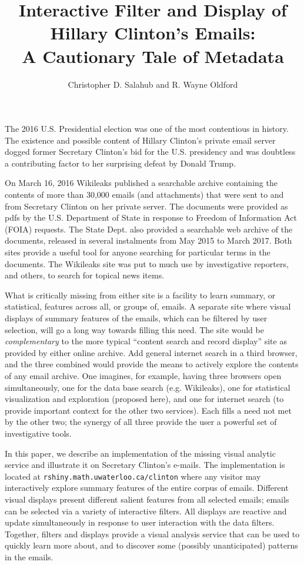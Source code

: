 \documentclass[journal]{vgtc}                %
\title{Interactive Filter and Display of Hillary Clinton's Emails: \\A Cautionary Tale of Metadata}
\author{Christopher D. Salahub and R. Wayne Oldford}
\begin{document}
\maketitle
The 2016 U.S. Presidential election was one of the most contentious in history.  The existence and possible content of Hillary Clinton's private email server dogged former Secretary Clinton's bid for the U.S. presidency and was doubtless a contributing factor to her surprising defeat by Donald Trump.

On March 16, 2016 Wikileaks  published a searchable archive \cite{Wikileaks} containing the contents of more than 30,000 emails (and attachments) that were sent to and from Secretary Clinton on her private server.  The documents were provided as pdfs by the U.S. Department of State in response to Freedom of Information Act (FOIA) \cite{FOIA} requests.  The State Dept. also provided a searchable web archive of the documents, released in several instalments from May 2015 to March 2017\cite{StateDeptFOIA}.   Both sites provide a  useful tool for anyone searching for particular terms in the documents.  The Wikileaks site was put to much use by investigative reporters, and others, to search for topical news items.

What is critically missing from either site is a facility to learn summary, or statistical, features across all, or groups of,  emails.   A separate site where visual displays of summary features of the emails, which can be filtered by user selection, will go a long way towards filling this need.  The site would be \emph{complementary} to the more typical ``content search and record display'' site as provided by either online archive.   Add general internet search in a third browser, and the three combined would provide the means to actively explore the contents of any email archive.    One imagines, for example, having three browsers open simultaneously, one for the data base search (e.g. Wikileaks), one for statistical visualization and exploration (proposed here), and one for internet search (to provide important context for the other two services).  Each fills a need not met by the other two; the synergy of all three provide the user a powerful set of investigative tools.

In this paper, we describe an implementation of the missing visual analytic service and illustrate it on Secretary Clinton's e-mails.  The implementation is located at  \texttt{rshiny.math.uwaterloo.ca/clinton} where any visitor may interactively explore summary features  of the entire corpus of emails.   Different visual displays present different salient features from all selected emails; emails can be selected via a variety of interactive filters.   All displays are reactive and update simultaneously in response to user interaction with the data filters.  Together, filters and displays provide a visual analysis service that can be used to quickly learn more about, and to discover some (possibly unanticipated) patterns in the emails. 
\end{document}
